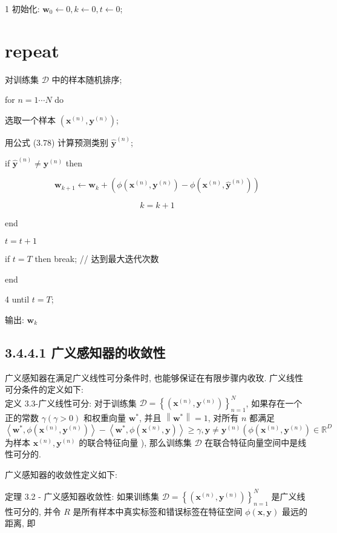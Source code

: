 \documentclass[10pt]{article}
\begin{document}
1 初始化: $\boldsymbol{w}_{0} \leftarrow 0, k \leftarrow 0, t \leftarrow 0$;

\section*{repeat}
对训练集 $\mathcal{D}$ 中的样本随机排序;

for $n=1 \cdots N$ do

选取一个样本 $\left(\boldsymbol{x}^{(n)}, \boldsymbol{y}^{(n)}\right)$;

用公式 (3.78) 计算预测类别 $\hat{\boldsymbol{y}}^{(n)}$;

if $\hat{\boldsymbol{y}}^{(n)} \neq \boldsymbol{y}^{(n)}$ then

$$
\boldsymbol{w}_{k+1} \leftarrow \boldsymbol{w}_{k}+\left(\phi\left(\boldsymbol{x}^{(n)}, \boldsymbol{y}^{(n)}\right)-\phi\left(\boldsymbol{x}^{(n)}, \hat{\boldsymbol{y}}^{(n)}\right)\right)
$$

$$
k=k+1
$$

end

$t=t+1$

if $t=T$ then break; // 达到最大迭代次数

end

4 until $t=T$;

输出: $\boldsymbol{w}_{k}$

\subsection*{3.4.4.1 广义感知器的收敛性}
广义感知器在满足广义线性可分条件时, 也能够保证在有限步骤内收玫. 广义线性可分条件的定义如下:\\
定义 3.3-广义线性可分: 对于训练集 $\mathcal{D}=\left\{\left(\boldsymbol{x}^{(n)}, \boldsymbol{y}^{(n)}\right)\right\}_{n=1}^{N}$, 如果存在一个正的常数 $\gamma(\gamma>0)$ 和权重向量 $\boldsymbol{w}^{*}$, 并且 $\left\|\boldsymbol{w}^{*}\right\|=1$, 对所有 $n$ 都满足 $\left\langle\boldsymbol{w}^{*}, \phi\left(\boldsymbol{x}^{(n)}, \boldsymbol{y}^{(n)}\right)\right\rangle-\left\langle\boldsymbol{w}^{*}, \phi\left(\boldsymbol{x}^{(n)}, \boldsymbol{y}\right)\right\rangle \geq \gamma, \boldsymbol{y} \neq \boldsymbol{y}^{(n)}\left(\phi\left(\boldsymbol{x}^{(n)}, \boldsymbol{y}^{(n)}\right) \in \mathbb{R}^{D}\right.$ 为样本 $\boldsymbol{x}^{(n)}, \boldsymbol{y}^{(n)}$ 的联合特征向量 ), 那么训练集 $\mathcal{D}$ 在联合特征向量空间中是线性可分的.

广义感知器的收敛性定义如下:

定理 3.2 - 广义感知器收敛性: 如果训练集 $\mathcal{D}=\left\{\left(\boldsymbol{x}^{(n)}, \boldsymbol{y}^{(n)}\right)\right\}_{n=1}^{N}$ 是广义线性可分的, 并令 $R$ 是所有样本中真实标签和错误标签在特征空间 $\phi(\boldsymbol{x}, \boldsymbol{y})$ 最远的距离, 即
\end{document}
